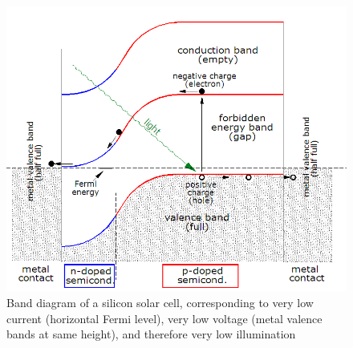 \documentclass[%
 aip,
 amsmath,amssymb,
 reprint, floatfix%
]{revtex4-2}
\begin{document}
    \begin{figure}
        \centering
        \includegraphics[scale = 0.3]{Figures/BandDiagramSolarCell-en.png}
        \caption{Band diagram of a silicon solar cell, corresponding to very low current (horizontal Fermi level), very low voltage (metal valence bands at same height), and therefore very low illumination}
        \label{fig:banddiagram}
    \end{figure}
\end{document}
